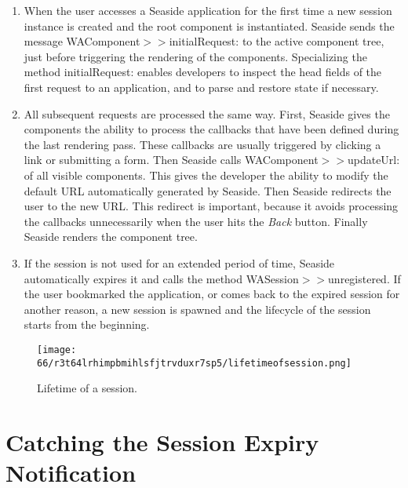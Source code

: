 \documentclass[a4paper,10pt,twoside]{book}
\newcommand{\ct}[1]{{\small\ttfamily\textup{#1}}}
\begin{document}
\begin{enumerate}
\item  When the user accesses a Seaside application for the first time a new session instance is created and the root component is instantiated. Seaside sends the message \ct{WAComponent$>$$>$initialRequest:}  to the active component tree, just before triggering the rendering of the components. Specializing the method \ct{initialRequest:} enables developers to inspect the head fields of the first request to an application, and to parse and restore state if necessary.
\item  All subsequent requests are processed the same way. First, Seaside gives the components the ability to process the callbacks that have been defined during the last rendering pass. These callbacks are usually triggered by clicking a link or submitting a form. Then Seaside calls \ct{WAComponent$>$$>$updateUrl:}  of all visible components. This gives the developer the ability to modify the default URL automatically generated by Seaside. Then Seaside redirects the user to the new URL. This redirect is important, because it avoids processing the callbacks unnecessarily when the user hits the \textit{Back} button. Finally Seaside renders the component tree.
\item  If the session is not used for an extended period of time, Seaside automatically expires it and calls the method   \ct{WASession$>$$>$unregistered}. If the user bookmarked the application, or comes back to the expired session for another reason, a new session is spawned and the lifecycle of the session starts from the beginning.
\end{enumerate}

\begin{figure}[h!tbp]
	\begin{center}
		\texttt{[image: 66/r3t64lrhimpbmihlsfjtrvduxr7sp5/lifetimeofsession.png]}
		\caption{Lifetime of a session.\label{book:inaction:session:lifetime:lifetime}}
	\end{center}
\end{figure}

  

\section{Catching the Session Expiry Notification}
\label{book:inaction:session:expiry}
\end{document}
